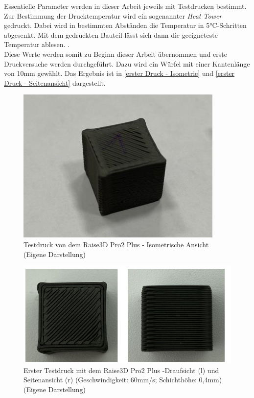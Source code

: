 Essentielle Parameter werden in dieser Arbeit jeweils mit Testdrucken bestimmt. Zur Bestimmung der Drucktemperatur wird ein sogenannter \textit{Heat Tower} gedruckt. Dabei wird in bestimmten Abständen die Temperatur in 5°C-Schritten abgesenkt. Mit dem gedruckten Bauteil lässt sich dann die geeigneteste Temperatur ablesen. \Autocite{M.Mickan}.\\

Diese Werte werden somit zu Beginn dieser Arbeit übernommen und erste Druckversuche werden durchgeführt. Dazu wird ein Würfel mit einer Kantenlänge von 10mm gewählt. Das Ergebnis ist in \autoref{erster Druck - Isometrie} und \autoref{erster Druck - Seitenansicht} dargestellt.


\begin{figure}[h]
	\centering
	\includegraphics[width=0.5\linewidth]{bilder/Testdruck auf Raise Pro 3D.png}
        \caption[Testdruck von dem Raise3D Pro2 Plus - Isometrische Ansicht] {Testdruck von dem Raise3D Pro2 Plus - Isometrische Ansicht (Eigene Darstellung)}
	\label{erster Druck - Isometrie}
\end{figure}
\begin{figure}[h]
	\centering
	\includegraphics[width=\linewidth]{bilder/Testdruck auf Raise Pro 3D Seitenansicht - Draufsicht.png}
        \caption[Erster Testdruck mit dem Raise3D Pro2 Plus - Seitenansicht und Draufsicht] {Erster Testdruck mit dem Raise3D Pro2 Plus -Draufsicht (l) und Seitenansicht (r) (Geschwindigkeit: 60mm/s; Schichthöhe: 0,4mm) (Eigene Darstellung)}
	\label{erster Druck - Seitenansicht}
\end{figure}

